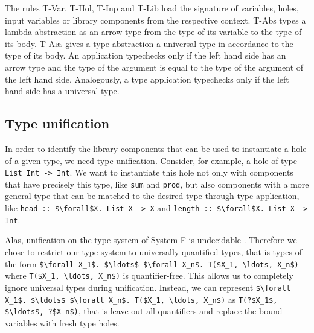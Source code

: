 \begin{prooftree}
\end{prooftree}

\begin{prooftree}
\end{prooftree}

\begin{prooftree}
\end{prooftree}

The rules T-Var, T-Hol, T-Inp and T-Lib load the signature of variables, holes, input variables or library components from the respective context.
T-Abs types a lambda abstraction as an arrow type from the type of its variable to the type of its body. \textsc{T-Abs} gives a type abstraction a universal type in accordance to the type of its body.
An application typechecks only if the left hand side has an arrow type and the type of the argument is equal to the type of the argument of the left hand side. Analogously, a type application typechecks only if the left hand side has a universal type.

\subsection{Type unification}

In order to identify the library components that can be used to instantiate a hole of a given type, we need type unification. Consider, for example, a hole of type \lstinline?List Int -> Int?. We want to instantiate this hole not only with components that have precisely this type, like \lstinline?sum? and \lstinline?prod?, but also components with a more general type that can be matched to the desired type through type application, like \lstinline?head :: $\forall$X. List X -> X? and \lstinline?length :: $\forall$X. List X -> Int?.

Alas, unification on the type system of System F is undecidable \cite{Huet1975}.
Therefore we chose to restrict our type system to universally quantified types, that is types of the form \lstinline?$\forall X_1$. $\ldots$ $\forall X_n$. T($X_1, \ldots, X_n$)? where \lstinline?T($X_1, \ldots, X_n$)? is quantifier-free.
This allows us to completely ignore universal types during unification. Instead, we can represent \lstinline?$\forall X_1$. $\ldots$ $\forall X_n$. T($X_1, \ldots, X_n$)? as \lstinline!T(?$X_1$, $\ldots$, ?$X_n$)!, that is leave out all quantifiers and replace the bound variables with fresh type holes.

